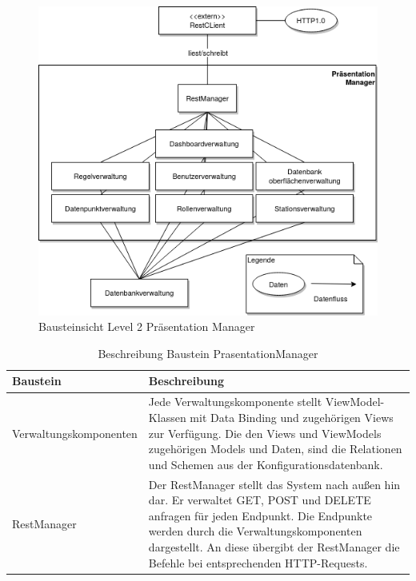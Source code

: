 \begin{figure}[h]
\centering
\includegraphics[width=1\textwidth]{Graphics/bausteinansicht_ebene_2_PrasentationManager.png}
\caption{Bausteinsicht Level 2 Pr\"asentation Manager}
\label{fig:bausteinsichtlvl2__PrasentationManager}
\end{figure}                 

\begin{table}[th]
	\begin{tabularx}{\textwidth}{|p{5cm}|X|}
		\hline
		Baustein & Beschreibung\\
		\hline
		Verwaltungskomponenten & Jede Verwaltungskomponente stellt ViewModel-Klassen mit Data Binding und zugehörigen Views zur Verfügung. Die den Views und ViewModels zugehörigen Models und Daten, sind die Relationen und Schemen aus der Konfigurationsdatenbank. \\
		\hline
		RestManager &  Der RestManager stellt das System nach außen hin dar. Er verwaltet GET, POST und DELETE anfragen für jeden Endpunkt. Die Endpunkte werden durch die Verwaltungskomponenten dargestellt. An diese übergibt der RestManager die Befehle bei entsprechenden HTTP-Requests.\\
		\hline
	\end{tabularx} 
	\caption{Beschreibung Baustein PrasentationManager}	\label{tab:Representation}
\end{table}

